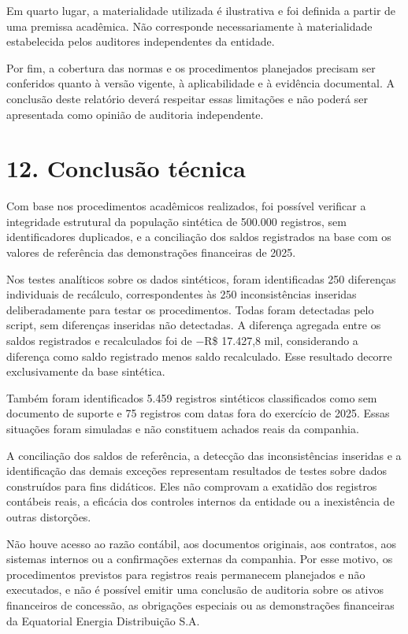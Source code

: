 \documentclass[
]{article}
\begin{document}
Em quarto lugar, a materialidade utilizada é ilustrativa e foi definida
a partir de uma premissa acadêmica. Não corresponde necessariamente à
materialidade estabelecida pelos auditores independentes da entidade.

Por fim, a cobertura das normas e os procedimentos planejados precisam
ser conferidos quanto à versão vigente, à aplicabilidade e à evidência
documental. A conclusão deste relatório deverá respeitar essas
limitações e não poderá ser apresentada como opinião de auditoria
independente.

\section{12. Conclusão técnica}\label{conclusuxe3o-tuxe9cnica}

Com base nos procedimentos acadêmicos realizados, foi possível verificar
a integridade estrutural da população sintética de 500.000 registros,
sem identificadores duplicados, e a conciliação dos saldos registrados
na base com os valores de referência das demonstrações financeiras de
2025.

Nos testes analíticos sobre os dados sintéticos, foram identificadas 250
diferenças individuais de recálculo, correspondentes às 250
inconsistências inseridas deliberadamente para testar os procedimentos.
Todas foram detectadas pelo script, sem diferenças inseridas não
detectadas. A diferença agregada entre os saldos registrados e
recalculados foi de −R\$ 17.427,8 mil, considerando a diferença como
saldo registrado menos saldo recalculado. Esse resultado decorre
exclusivamente da base sintética.

Também foram identificados 5.459 registros sintéticos classificados como
sem documento de suporte e 75 registros com datas fora do exercício de
2025. Essas situações foram simuladas e não constituem achados reais da
companhia.

A conciliação dos saldos de referência, a detecção das inconsistências
inseridas e a identificação das demais exceções representam resultados
de testes sobre dados construídos para fins didáticos. Eles não
comprovam a exatidão dos registros contábeis reais, a eficácia dos
controles internos da entidade ou a inexistência de outras distorções.

Não houve acesso ao razão contábil, aos documentos originais, aos
contratos, aos sistemas internos ou a confirmações externas da
companhia. Por esse motivo, os procedimentos previstos para registros
reais permanecem planejados e não executados, e não é possível emitir
uma conclusão de auditoria sobre os ativos financeiros de concessão, as
obrigações especiais ou as demonstrações financeiras da Equatorial
Energia Distribuição S.A.
\end{document}
